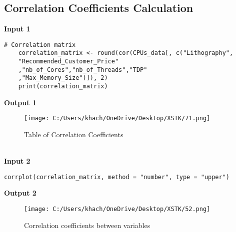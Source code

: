 \documentclass[a4paper]{article}
\begin{document}
	\subsection{Correlation Coefficients Calculation}
	\textbf{Input 1}
	\begin{lstlisting}[frame=single, backgroundcolor=\color{gray!10}, breaklines=true, columns=fullflexible]
	# Correlation matrix 
	correlation_matrix <- round(cor(CPUs_data[, c("Lithography",
	"Recommended_Customer_Price"
	,"nb_of_Cores","nb_of_Threads","TDP"
	,"Max_Memory_Size")]), 2)
	print(correlation_matrix)
	\end{lstlisting}
	\textbf{Output 1}
	\begin{figure}[htbp]
		\centering
		\begin{adjustbox}{width=1\textwidth, frame}
			\texttt{[image: C:/Users/khach/OneDrive/Desktop/XSTK/71.png]}
		\end{adjustbox}
		\captionsetup{justification=centering}
		\vspace{0.5cm}
		\caption{Table of Correlation Coefficients}
	\end{figure}
	\\
	\textbf{Input 2}
	\begin{lstlisting}[frame=single, backgroundcolor=\color{gray!10}, breaklines=true, columns=fullflexible]
	corrplot(correlation_matrix, method = "number", type = "upper")
	\end{lstlisting}
	\textbf{Output 2}
	\begin{figure}[htbp]
		\centering
		\begin{adjustbox}{width=0.7\textwidth, frame}
			\texttt{[image: C:/Users/khach/OneDrive/Desktop/XSTK/52.png]}
		\end{adjustbox}
		\captionsetup{justification=centering}
		\vspace{0.5cm}
		\caption{Correlation coefficients between variables}
	\end{figure}
	\newpage
\end{document}
